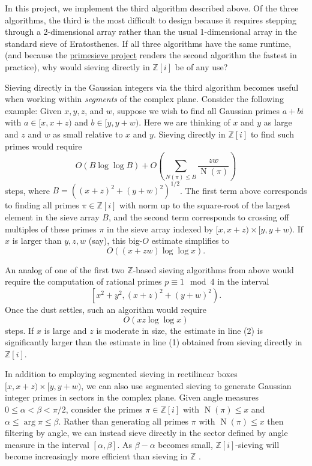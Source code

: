 \documentclass{article}
\begin{document}
 
In this project, we implement the third algorithm described above. Of the three algorithms, the third is the most difficult to design because it requires stepping through a 2-dimensional array rather than the usual 1-dimensional array in the standard sieve of Eratosthenes. If all three algorithms have the same runtime, (and because the \href{https://github.com/kimwalisch/primesieve}{primesieve project} renders the second algorithm the fastest in practice), why would sieving directly in $\mathbb{Z}[i]$ be of any use?

Sieving directly in the Gaussian integers via the third algorithm becomes useful when working within \emph{segments} of the complex plane. Consider the following example: Given $x, y, z$, and $w$, suppose we wish to find all Gaussian primes $a + bi$ with $a \in [x, x + z)$ and $b \in  [y, y + w)$. Here we are thinking of $x$ and $y$ as large and $z$ and $w$ as small relative to $x$ and $y$. Sieving directly in $\mathbb{Z}[i]$ to find such primes would require
$$O(B \log \log B) + O\left(\sum_{ N(\pi) \le B } \frac{zw}{\operatorname N(\pi)}\right)$$
steps, where $B = ((x + z)^2 + (y + w)^2)^{1/2}$. The first term above corresponds to finding all primes $\pi \in \mathbb{Z}[i]$ with norm up to the square-root of the largest element in the sieve array $B$, and the second term corresponds to crossing off multiples of these primes $\pi$ in the sieve array indexed by $[x, x + z) \times [y, y + w)$. If $x$ is larger than $y, z, w$ (say), this big-$O$ estimate simplifies to
\begin{equation}
O((x + zw) \log \log x).
\end{equation}

An analog of one of the first two $\mathbb{Z}$-based sieving algorithms from above would require the computation of rational primes $p \equiv 1 \mod 4$ in the interval
$$\left[ x^2 + y^2, (x + z)^2 + (y + w)^2 \right).$$
Once the dust settles, such an algorithm would require
\begin{equation}
O(xz\log\log x)
\end{equation}
steps. If $x$ is large and $z$ is moderate in size, the estimate in line (2) is significantly larger than the estimate in line (1) obtained from sieving directly in $\mathbb{Z}[i]$.

In addition to employing segmented sieving in rectilinear boxes $[x, x + z) \times [y, y + w)$, we can also use segmented sieving to generate Gaussian integer primes in sectors in the complex plane. Given angle measures $0 \le \alpha < \beta < \pi/2$, consider the primes $\pi \in \mathbb{Z}[i]$ with $\operatorname N (\pi) \le x$ and $\alpha \le \arg \pi \le \beta$. Rather than generating all primes $\pi$ with $\operatorname N (\pi) \le x$ then filtering by angle, we can instead sieve directly in the sector defined by angle measure in the interval $[\alpha, \beta]$. As $\beta - \alpha$ becomes small, $\mathbb{Z}[i]$-sieving will become increasingly more efficient than sieving in $\mathbb{Z}$ .
\end{document}
